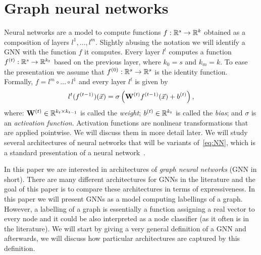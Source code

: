 

\section{Graph neural networks}
Neural networks are a model to compute functions $f : \mathbb{R}^s \to \mathbb{R}^k$ obtained as a composition of layers $l^1,\ldots, l^m$.  Slightly abusing the notation we will identify a GNN with the function $f$ it computes. Every layer $l^t$ computes a function $f^{(t)} : \mathbb{R}^{s} \to \mathbb{R}^{k_t}$ based on the previous layer, where $k_0 = s$ and $k_m =k$. To ease the presentation we assume that $f^{(0)} : \mathbb{R}^s \to \mathbb{R}^s$ is the identity function. Formally, $f = l^m \circ \ldots \circ l^1 $ and every layer $l^t$ is given by
\begin{equation}\label{eq:NN}
 l^t(f^{(t-1)}) (\vec{x}) = \sigma \left(\mathbf{W}^{(t)} f^{(t-1)}(\vec{x}) + b^{(t)}  \right),
\end{equation}
where: $\mathbf{W}^{(t)} \in \mathbb{R}^{k_{t} \times k_{t-1}}$ is called the \emph{weight}; $b^{(t)} \in \mathbb{R}^{k_t}$ is called the \emph{bias}; and $\sigma$ is an \emph{activation function}. Activation functions are nonlinear transformations that are applied pointwise. We will discuss them in more detail later. We will study several architectures of neural networks that will be variants of~\eqref{eq:NN}, which is a standard presentation of a neural network~\cite{?}.

In this paper we are interested in architectures of \emph{graph neural networks} (GNN in short). 
There are many different architectures for GNNs in the literature and the goal of this paper is to compare these architectures in terms of expressiveness. In this paper we will present GNNs as a model computing labellings of a graph. However, a labelling of a graph is essentially a function assigning a real vector to every node and it could be also interpreted as a node classifier (as it often is in the literature). We will start by giving a very general definition of a GNN and afterwards, we will discuss how particular architectures are captured by this definition.

